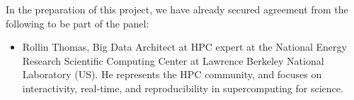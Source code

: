 In the preparation of this project, we have already secured agreement from the
following to be part of the panel:
\begin{itemize}
\item Rollin Thomas, Big Data Architect at HPC expert at the National Energy
  Research Scientific Computing Center at Lawrence Berkeley National Laboratory
  (US). He represents the HPC community, and focuses on interactivity,
  real-time, and reproducibility in supercomputing for science.
\end{itemize}